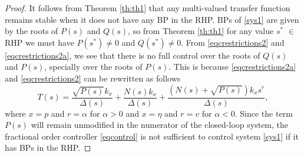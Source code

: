 \documentclass[twoside,reqno,11pt]{fcaa-var} %
\begin{document}
\begin{proof}
	It follows from Theorem \ref{th:th1} that any multi-valued transfer function remains stable when it does not have any BP in the RHP. BPs of \eqref{sys1} are given by the roots of $P(s)$ and $Q(s)$, so from Theorem \ref{th:th1} for any value $s^*$ $\in$ RHP we must have $P(s^*)\neq 0$ and $Q(s^*)\neq 0$. From \eqref{eqcrestrictions2} and \eqref{eqcrestrictions2a},
	we see that there is no full control over the roots of $Q(s)$ and $P(s)$, specially over the roots of $P(s)$. This is because \eqref{eqcrestrictions2a} and \eqref{eqcrestrictions2} can be rewritten as follows
	\begin{equation}
	T(s)=\frac{\sqrt{P(s)}k_x}{\Delta(s)}+\frac{N(s)k_x}{\Delta(s)}+\frac{(N(s)+\sqrt{P(s)})k_xs^r}{\Delta(s)},
	\end{equation}
	where $x=p$ and $r=\alpha$ for $\alpha>0$ and $x=\eta$ and $r=v$ for $\alpha<0$. Since the term $P(s)$ will remain unmodified in the numerator of the closed-loop system, the fractional order controller \eqref{eqcontrol} is not sufficient to control system \eqref{sys1} if it has BPs in the RHP.
\end{proof}
\end{document}
